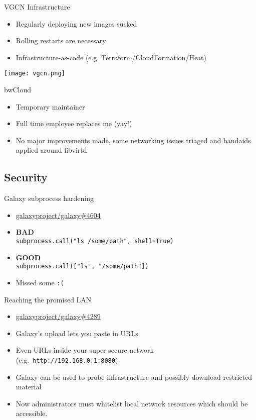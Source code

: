 \documentclass[12pt]{ufrslides}
\newcommand{\ghpr}[3]{\href{https://github.com/#1/#2/pull/#3}{#1/#2\##3}}
\begin{document}
	\begin{frame}{VGCN Infrastructure}
		\begin{itemize}
			\item Regularly deploying new images sucked
			\item Rolling restarts are necessary
			\item Infrastructure-as-code (e.g. Terraform/CloudFormation/Heat)
		\end{itemize}
		\texttt{[image: vgcn.png]}
	\end{frame}

	\begin{frame}{bwCloud}
		\begin{itemize}
			\item Temporary maintainer
			\item Full time employee replaces me (yay!)
			\item No major improvements made, some networking issues triaged and bandaids applied around libvirtd
		\end{itemize}
	\end{frame}

\subsection{Security}

	\begin{frame}{Galaxy subprocess hardening}
		\begin{itemize}
			\item \ghpr{galaxyproject}{galaxy}{4604}
			\item \textbf{BAD}\\ \texttt{subprocess.call("ls /some/path", shell=True)}
			\item \textbf{GOOD}\\ \texttt{subprocess.call(["ls", "/some/path"])}
			\item Missed some \texttt{:(}
		\end{itemize}
	\end{frame}

	\begin{frame}{Reaching the promised LAN}
		\begin{itemize}
			\item \ghpr{galaxyproject}{galaxy}{4289}
			\item Galaxy's upload lets you paste in URLs
			\item Even URLs inside your super secure network (e.g.~\texttt{http://192.168.0.1:8080})
			\item Galaxy can be used to probe infrastructure and possibly download restricted material
			\item Now administrators must whitelist local network resources which should be accessible.
		\end{itemize}
	\end{frame}
\end{document}
